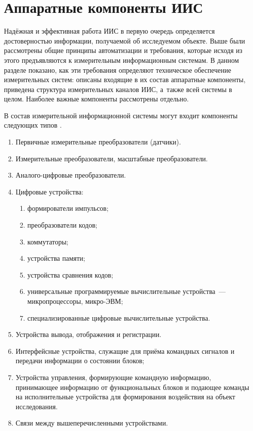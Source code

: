 \documentclass[a4paper, 14pt, titlepage]{extarticle}
\let\oldsection\section
\renewcommand{\section}{\newpage\oldsection}
\begin{document}
  \section{Аппаратные компоненты ИИС}\label{sec:hardware}

  Надёжная и эффективная работа ИИС в первую очередь определяется достоверностью информации,
  получаемой об исследуемом объекте. Выше были рассмотрены общие принципы автоматизации и
  требования, которые исходя из этого предъявляются к измерительным информационным системам.
  В данном разделе показано, как эти требования определяют техническое обеспечение измерительных систем: описаны входящие в их
  состав аппаратные компоненты, приведена структура измерительных каналов ИИС, а~также всей системы
  в целом. Наиболее важные компоненты рассмотрены отдельно.


  В состав измерительной информационной системы могут входит компоненты следующих типов
  \cite[с.~15]{volkov-iis}.
  \begin{enumerate}
    \item Первичные измерительные преобразователи (датчики).
    \item Измерительные преобразователи, масштабные преобразователи.
    \item Аналого-цифровые преобразователи.
    \item Цифровые устройства:
      \begin{enumerate}
        \item формирователи импульсов;
        \item преобразователи кодов;
        \item коммутаторы;
        \item устройства памяти;
        \item устройства сравнения кодов;
        \item универсальные программируемые вычислительные устройства~--- микропроцессоры, микро-ЭВМ;
        \item специализированные цифровые вычислительные устройства.
      \end{enumerate}
    \item Устройства вывода, отображения и регистрации.
    \item Интерфейсные устройства, служащие для приёма командных сигналов и передачи информации о
      состоянии блоков;
    \item Устройства управления, формирующие командную информацию, принимающее информацию от
      функциональных блоков и подающее команды на исполнительные устройства для формирования
      воздействия на объект исследования.
    \item Связи между вышеперечисленными устройствами.
  \end{enumerate}
\end{document}
